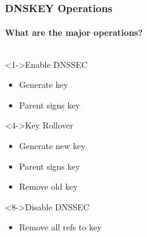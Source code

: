 \documentclass{beamer}
\begin{document}
\begin{frame}
  \frametitle{DNSKEY Operations}
  \framesubtitle{What are the major operations?}

  \begin{columns}[c]
    \begin{column}{4.8cm}
      \begin{block}<1->{Enable DNSSEC}
        \begin{itemize}
        \item Generate key
        \item Parent signs key
        \end{itemize}
      \end{block}

      \begin{block}<4->{Key Rollover}
        \begin{itemize}
        \item Generate new key
        \item Parent signs key
        \item Remove old key
        \end{itemize}
      \end{block}

      \begin{block}<8->{Disable DNSSEC}
        \begin{itemize}
        \item Remove \alert{all} refs to key
        \end{itemize}
      \end{block}

    \end{column}


  \end{columns}

\end{frame}
\end{document}
